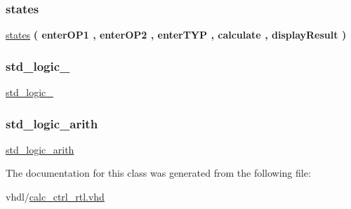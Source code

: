 \subsubsection{\texorpdfstring{states}{states}}
{\footnotesize\ttfamily \hyperlink{classcalc__ctrl_1_1rtl_a8bc0dac7a50e3f941ae2eb6dc9a2a814}{states} {\bfseries \textcolor{vhdlchar}{(}\textcolor{vhdlchar}{ }\textcolor{vhdlchar}{enter\+O\+P1}\textcolor{vhdlchar}{ }\textcolor{vhdlchar}{,}\textcolor{vhdlchar}{ }\textcolor{vhdlchar}{enter\+O\+P2}\textcolor{vhdlchar}{ }\textcolor{vhdlchar}{,}\textcolor{vhdlchar}{ }\textcolor{vhdlchar}{enter\+T\+YP}\textcolor{vhdlchar}{ }\textcolor{vhdlchar}{,}\textcolor{vhdlchar}{ }\textcolor{vhdlchar}{calculate}\textcolor{vhdlchar}{ }\textcolor{vhdlchar}{,}\textcolor{vhdlchar}{ }\textcolor{vhdlchar}{display\+Result}\textcolor{vhdlchar}{ }\textcolor{vhdlchar}{)}\textcolor{vhdlchar}{ }} \hspace{0.3cm}{\ttfamily [Type]}}

\mbox{\label{classcalc__ctrl_1_1rtl_acd03516902501cd1c7296a98e22c6fcb}} 
\subsubsection{\texorpdfstring{std\+\_\+logic\+\_}{std\_logic\_1164}}
{\footnotesize\ttfamily \hyperlink{classcalc__ctrl_1_1rtl_acd03516902501cd1c7296a98e22c6fcb}{std\+\_\+logic\+\_}\hspace{0.3cm}{\ttfamily [Package]}}

\mbox{\label{classcalc__ctrl_1_1rtl_a0f5ecc6613f63d07f7963a97b1b26095}} 
\subsubsection{\texorpdfstring{std\+\_\+logic\+\_\+arith}{std\_logic\_arith}}
{\footnotesize\ttfamily \hyperlink{classcalc__ctrl_1_1rtl_a0f5ecc6613f63d07f7963a97b1b26095}{std\+\_\+logic\+\_\+arith}\hspace{0.3cm}{\ttfamily [Package]}}



The documentation for this class was generated from the following file\+:\begin{DoxyCompactItemize}
\item 
vhdl/\hyperlink{calc__ctrl__rtl_8vhd}{calc\+\_\+ctrl\+\_\+rtl.\+vhd}\end{DoxyCompactItemize}
